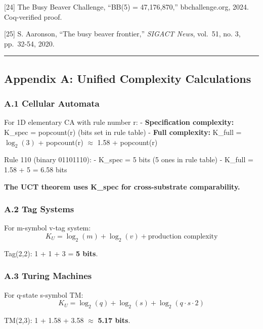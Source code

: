 \documentclass[
  11pt,
]{article}
\begin{document}
{[}24{]} The Busy Beaver Challenge, ``BB(5) = 47,176,870,''
bbchallenge.org, 2024. Coq-verified proof.

{[}25{]} S. Aaronson, ``The busy beaver frontier,'' \emph{SIGACT News},
vol.~51, no. 3, pp.~32-54, 2020.

\begin{center}\rule{0.5\linewidth}{0.5pt}\end{center}

\hypertarget{appendix-a-unified-complexity-calculations}{%
\subsection{Appendix A: Unified Complexity
Calculations}\label{appendix-a-unified-complexity-calculations}}

\hypertarget{a.1-cellular-automata}{%
\subsubsection{A.1 Cellular Automata}\label{a.1-cellular-automata}}

For 1D elementary CA with rule number r: - \textbf{Specification
complexity:} K\_spec = popcount(r) (bits set in rule table) -
\textbf{Full complexity:} K\_full = $\log_2(3)$ + popcount(r) $\approx$ 1.58 +
popcount(r)

Rule 110 (binary 01101110): - K\_spec = 5 bits (5 ones in rule table) -
K\_full = 1.58 + 5 = 6.58 bits

\textbf{The UCT theorem uses K\_spec for cross-substrate comparability.}

\hypertarget{a.2-tag-systems}{%
\subsubsection{A.2 Tag Systems}\label{a.2-tag-systems}}

For m-symbol v-tag system:
\[K_U = \log_2(m) + \log_2(v) + \text{production complexity}\]

Tag(2,2): 1 + 1 + 3 = \textbf{5 bits}.

\hypertarget{a.3-turing-machines}{%
\subsubsection{A.3 Turing Machines}\label{a.3-turing-machines}}

For q-state s-symbol TM:
\[K_U = \log_2(q) + \log_2(s) + \log_2(q \cdot s \cdot 2)\]

TM(2,3): 1 + 1.58 + 3.58 $\approx$ \textbf{5.17 bits}.
\end{document}
